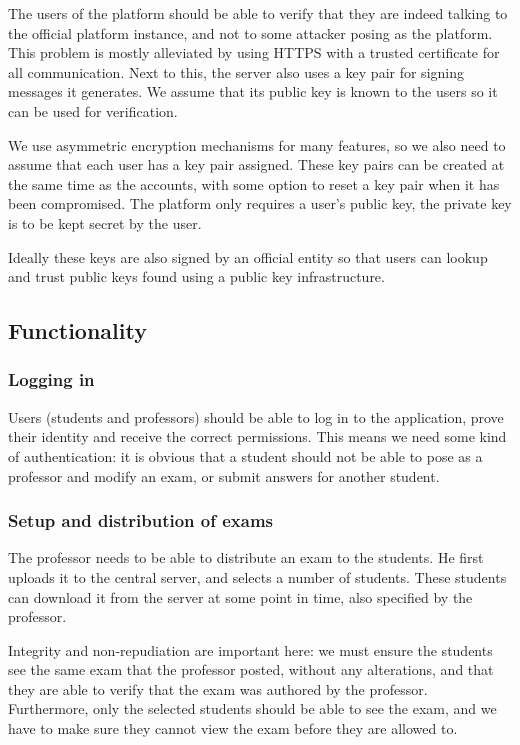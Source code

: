 \documentclass[12pt]{article}
\begin{document}
The users of the platform should be able to verify that they are indeed talking
to the official platform instance, and not to some attacker posing as the
platform. This problem is mostly alleviated by using HTTPS with a trusted
certificate for all communication. Next to this, the server also uses a key pair
for signing messages it generates. We assume that its public key is known to the
users so it can be used for verification.

We use asymmetric encryption mechanisms for many features, so we also need to
assume that each user has a key pair assigned. These key pairs can be created at
the same time as the accounts, with some option to reset a key pair when it has
been compromised. The platform only requires a user's public key, the private
key is to be kept secret by the user.

Ideally these keys are also signed by an official entity so that users can
lookup and trust public keys found using a public key infrastructure.

\subsection{Functionality}
\label{subsec:req-functionality}

\subsubsection{Logging in}
\label{subsubsec:req-func-auth}

Users (students and professors) should be able to log in to the application,
prove their identity and receive the correct permissions. This means we need
some kind of authentication: it is obvious that a student should not be able to
pose as a professor and modify an exam, or submit answers for another student.

\subsubsection{Setup and distribution of exams}
\label{subsubsec:req-func-exams}

The professor needs to be able to distribute an exam to the students. He first
uploads it to the central server, and selects a number of students. These
students can download it from the server at some point in time, also specified
by the professor.

Integrity and non-repudiation are important here: we must ensure the students
see the same exam that the professor posted, without any alterations, and that
they are able to verify that the exam was authored by the professor.
Furthermore, only the selected students should be able to see the exam, and we
have to make sure they cannot view the exam before they are allowed to.
\end{document}
